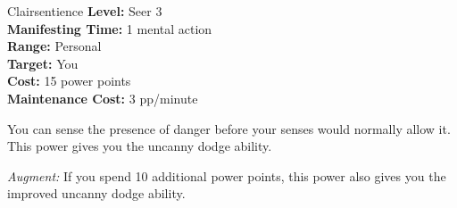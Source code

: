 {Clairsentience}
{
	\textbf{Level:}
	Seer 3\\
	\textbf{Manifesting Time:}
	1 mental action\\
	\textbf{Range:}
	Personal\\
	\textbf{Target:}
	You\\
	\textbf{Cost:}
	15 power points\\
	\textbf{Maintenance Cost:}
	3 pp/minute\\
}
{
	You can sense the presence of danger before your senses would normally allow it. This power gives you the uncanny dodge ability.

	\textit{Augment:} If you spend 10 additional power points, this power also gives you the improved uncanny dodge ability.
}